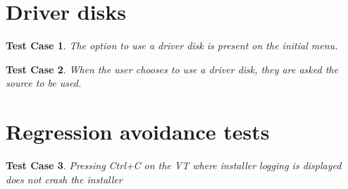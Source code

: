 \documentclass[a4paper]{article}
\newtheorem{testcase}{Test Case}
\begin{document}
\section{Driver disks}

\begin{testcase}
The option to use a driver disk is present on the initial menu.
\end{testcase}

\begin{testcase}
When the user chooses to use a driver disk, they are asked the source
to be used.
\end{testcase}

\section{Regression avoidance tests}

\begin{testcase}
Pressing Ctrl+C on the VT where installer logging is displayed does
not crash the installer
\end{testcase}
\end{document}
